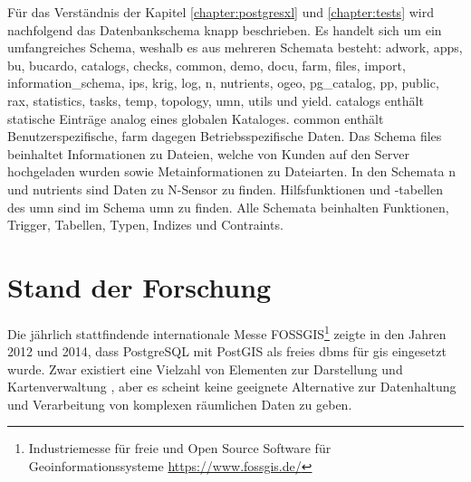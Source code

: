 Für das Verständnis der Kapitel \ref{chapter:postgresxl} und \ref{chapter:tests} wird nachfolgend das Datenbankschema knapp beschrieben.
Es handelt sich um ein umfangreiches Schema, weshalb es aus mehreren Schemata besteht:
adwork, apps, bu, bucardo, catalogs, checks, common, demo, docu, farm, files, import, information\_{}schema, ips, krig, log, n, nutrients, ogeo, pg\_{}catalog, pp, public, rax, statistics, tasks, temp, topology, umn, utils und yield.
catalogs enthält statische Einträge analog eines globalen Kataloges.
common enthält Benutzerspezifische, farm dagegen Betriebsspezifische Daten.
Das Schema files beinhaltet Informationen zu Dateien, welche von Kunden auf den Server hochgeladen wurden sowie Metainformationen zu Dateiarten.
In den Schemata n und nutrients sind Daten zu N-Sensor zu finden.
Hilfsfunktionen und -tabellen des \Gls{umn} sind im Schema umn zu finden.
Alle Schemata beinhalten Funktionen, Trigger, Tabellen, Typen, Indizes und Contraints.



\section{Stand der Forschung}
\label{forschungsstand}

Die jährlich stattfindende internationale Messe FOSSGIS\footnote{Industriemesse für freie und Open Source Software für Geoinformationssysteme \url{https://www.fossgis.de/}} zeigte in den Jahren 2012 und 2014, dass PostgreSQL mit PostGIS als freies \Gls{dbms} für \Gls{gis} eingesetzt wurde.
Zwar existiert eine Vielzahl von Elementen zur Darstellung und Kartenverwaltung%
, aber es scheint keine geeignete Alternative zur Datenhaltung und Verarbeitung von komplexen räumlichen Daten zu geben.

